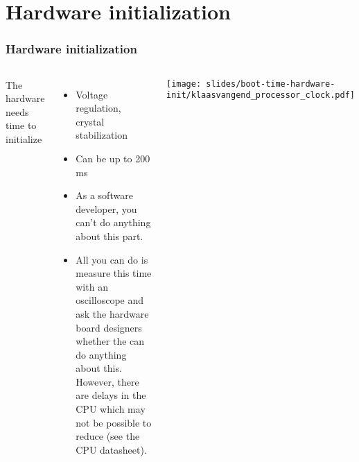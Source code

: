 \section{Hardware initialization}

\begin{frame}
\frametitle{Hardware initialization}
\begin{columns}
The hardware needs time to initialize
\begin{itemize}
\item Voltage regulation, crystal stabilization
\item Can be up to 200 ms
\item As a software developer, you can't do anything about this part.
\item All you can do is measure this time with an oscilloscope and
      ask the hardware board designers whether the can do anything about
      this. However, there are delays in the CPU which may not be
      possible to reduce (see the CPU datasheet).
\end{itemize}
\texttt{[image: slides/boot-time-hardware-init/klaasvangend\_processor\_clock.pdf]}
\end{columns}
\end{frame}


